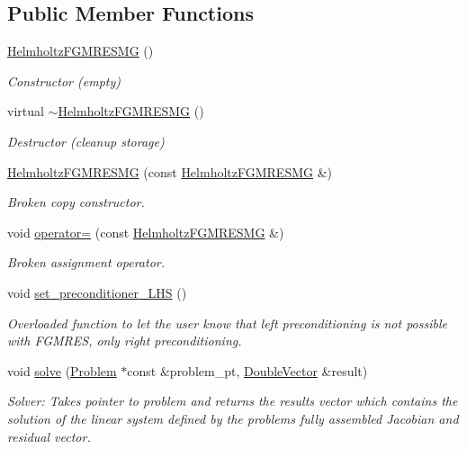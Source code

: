 \subsection*{Public Member Functions}
\begin{DoxyCompactItemize}
\item 
\hyperlink{classoomph_1_1HelmholtzFGMRESMG_abadd59fadd8ddf7804cb6696f567dbe9}{Helmholtz\+F\+G\+M\+R\+E\+S\+MG} ()
\begin{DoxyCompactList}\small\item\em Constructor (empty) \end{DoxyCompactList}\item 
virtual \hyperlink{classoomph_1_1HelmholtzFGMRESMG_a89c8378219342c65d10f2c0af160bebf}{$\sim$\+Helmholtz\+F\+G\+M\+R\+E\+S\+MG} ()
\begin{DoxyCompactList}\small\item\em Destructor (cleanup storage) \end{DoxyCompactList}\item 
\hyperlink{classoomph_1_1HelmholtzFGMRESMG_af6066d4a36010eab35396919566058c3}{Helmholtz\+F\+G\+M\+R\+E\+S\+MG} (const \hyperlink{classoomph_1_1HelmholtzFGMRESMG}{Helmholtz\+F\+G\+M\+R\+E\+S\+MG} \&)
\begin{DoxyCompactList}\small\item\em Broken copy constructor. \end{DoxyCompactList}\item 
void \hyperlink{classoomph_1_1HelmholtzFGMRESMG_a44c13f9627e5700eb9a14bdfc890fb22}{operator=} (const \hyperlink{classoomph_1_1HelmholtzFGMRESMG}{Helmholtz\+F\+G\+M\+R\+E\+S\+MG} \&)
\begin{DoxyCompactList}\small\item\em Broken assignment operator. \end{DoxyCompactList}\item 
void \hyperlink{classoomph_1_1HelmholtzFGMRESMG_ae3272923b5eb1bd6d7f494a8bafdf303}{set\+\_\+preconditioner\+\_\+\+L\+HS} ()
\begin{DoxyCompactList}\small\item\em Overloaded function to let the user know that left preconditioning is not possible with F\+G\+M\+R\+ES, only right preconditioning. \end{DoxyCompactList}\item 
void \hyperlink{classoomph_1_1HelmholtzFGMRESMG_a36a1d601676df2ebe39fcdb7a0837864}{solve} (\hyperlink{classoomph_1_1Problem}{Problem} $\ast$const \&problem\+\_\+pt, \hyperlink{classoomph_1_1DoubleVector}{Double\+Vector} \&result)
\begin{DoxyCompactList}\small\item\em Solver\+: Takes pointer to problem and returns the results vector which contains the solution of the linear system defined by the problem\textquotesingle{}s fully assembled Jacobian and residual vector. \end{DoxyCompactList}\end{DoxyCompactItemize}
